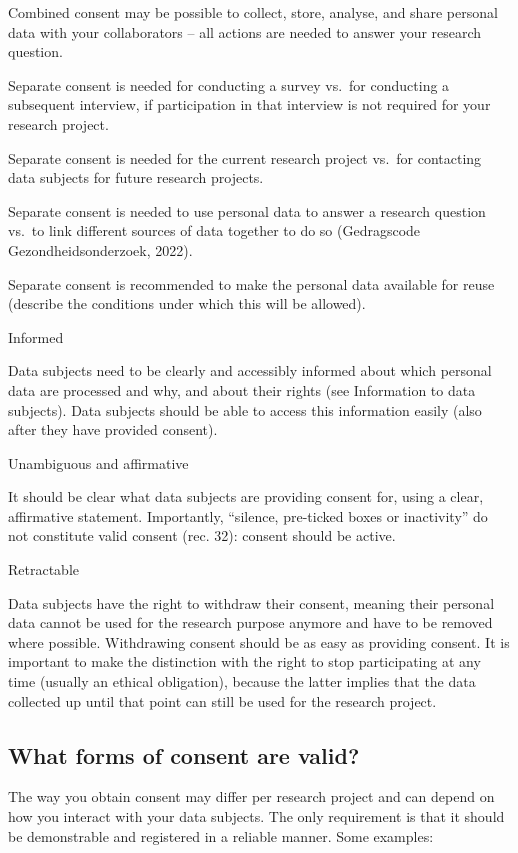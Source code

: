 \documentclass[
]{book}
\begin{document}
Combined consent may be possible to collect, store, analyse, and share
personal data with your collaborators -- all actions are needed to answer your
research question.

Separate consent is needed for conducting a survey vs.~for conducting a
subsequent interview, if participation in that interview is not required for
your research project.

Separate consent is needed for the current research project vs.~for contacting
data subjects for future research projects.

Separate consent is needed to use personal data to answer a research question
vs.~to link different sources of data together to do so
(Gedragscode Gezondheidsonderzoek, 2022).

Separate consent is recommended to make the personal data
available for reuse (describe the
conditions under which this will be allowed).

Informed

Data subjects need to be clearly and accessibly informed about which personal
data are processed and why, and about their rights (see
Information to data subjects). Data subjects should be
able to access this information easily (also after they have provided
consent).

Unambiguous and affirmative

It should be clear what data subjects are providing consent for, using
a clear, affirmative statement. Importantly, ``silence, pre-ticked boxes or
inactivity'' do not constitute valid consent
(rec. 32):
consent should be active.

Retractable

Data subjects have the
right to withdraw their consent, meaning
their personal data cannot be used for the research purpose anymore and have to
be removed where possible. Withdrawing consent should be as easy as providing
consent. It is important to make the distinction with the right to stop
participating at any time (usually an ethical obligation), because the latter
implies that the data collected up until that point can still be used for the
research project.

\hypertarget{forms-consent}{%
\subsection{What forms of consent are valid?}\label{forms-consent}}

The way you obtain consent may differ per research project and can depend on
how you interact with your data subjects. The only requirement is that it should
be demonstrable and registered in a reliable manner. Some examples:
\end{document}
